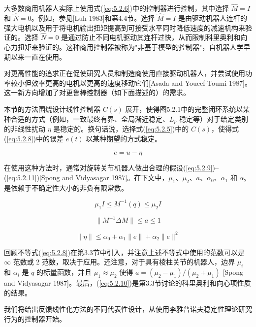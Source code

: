 \documentclass[UTF8,12pt,a4paper]{ctexart}
\begin{document}
大多数商用机器人实际上使用式(\ref{eq:5.2.6})中的控制器进行控制，其中选择 $\hat{M} = I$ 和 $\hat{N} = 0$。例如，参见[Luh 1983]和第4.4节。选择 $\hat{M} = I$ 是由驱动机器人连杆的强大电机以及用于将电机输出扭矩提高到可接受水平同时降低速度的减速机构来验证的。选择 $\hat{N} = 0$ 是通过防止不同电机驱动其连杆过快，从而限制科里奥利和向心力扭矩来验证的。这种商用控制器被称为"非基于模型的控制器"，自机器人学早期以来一直在使用。

对更高性能的追求正在促使研究人员和制造商使用直接驱动机器人，并尝试使用功率较小但效率更高的电机以更高的速度移动它们[Asada and Youcef-Toumi 1987]。这一新方向增加了对更鲁棒控制器（如下面描述的）的需求。

本节的方法围绕设计线性控制器 $C(s)$ 展开，使得图5.2.1中的完整闭环系统以某种合适的方式（例如，一致最终有界、全局渐近稳定、$L_p$ 稳定等）对于给定类别的非线性扰动 $\eta$ 是稳定的。换句话说，选择式(\ref{eq:5.2.5})中的 $C(s)$，使得式(\ref{eq:5.2.8})中的误差 $e(t)$ 以某种期望的方式稳定。

\begin{equation}\label{eq:5.2.8}
\ddot{e} = u - \eta
\end{equation}

在使用这种方法时，通常对旋转关节机器人做出合理的假设(\ref{eq:5.2.9})--(\ref{eq:5.2.11})[Spong and Vidyasagar 1987]。在下文中，$\mu_1$、$\mu_2$、$a$、$\alpha_0$、$\alpha_1$ 和 $\alpha_2$ 是依赖于不确定性大小的非负有限常数。

\begin{equation}\label{eq:5.2.9}
\mu_1 I \leq M^{-1}(q) \leq \mu_2 I
\end{equation}

\begin{equation}\label{eq:5.2.10}
\|M^{-1}\Delta M\| \leq a \leq 1
\end{equation}

\begin{equation}\label{eq:5.2.11}
\|\eta\| \leq \alpha_0 + \alpha_1\|e\| + \alpha_2\|e\|^2
\end{equation}

回顾不等式(\ref{eq:5.2.8})在第3.3节中引入，并注意上述不等式中使用的范数可以是 $\infty$ 范数或 2 范数，取决于应用。还注意，对于具有棱柱关节的机器人，边界 $\mu_i$ 和 $\alpha_i$ 是 $q$ 的标量函数，并且 $\mu_1 \approx \mu_2$ 使得 $a = (\mu_2 - \mu_1)/(\mu_2 + \mu_1)$ [Spong and Vidyasagar 1987]。最后，(\ref{eq:5.2.10})是第3.3节讨论的科里奥利和向心项性质的结果。

我们将给出反馈线性化方法的不同代表性设计，从使用李雅普诺夫稳定性理论研究行为的控制器开始。
\end{document}
